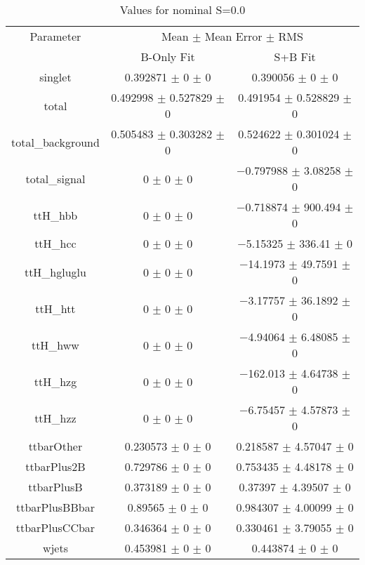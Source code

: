 \begin{table}
\centering
\caption{Values for nominal S=0.0}
\begin{tabular}{ccc}
\toprule
Parameter & \multicolumn{2}{c}{Mean $\pm$ Mean Error $\pm$ RMS}\\
 & B-Only Fit & S+B Fit\\
\midrule
singlet & \num{0.392871} $\pm$ \num{0} $\pm$ \num{0} & \num{0.390056} $\pm$ \num{0} $\pm$ \num{0}\\
total & \num{0.492998} $\pm$ \num{0.527829} $\pm$ \num{0} & \num{0.491954} $\pm$ \num{0.528829} $\pm$ \num{0}\\
total\_background & \num{0.505483} $\pm$ \num{0.303282} $\pm$ \num{0} & \num{0.524622} $\pm$ \num{0.301024} $\pm$ \num{0}\\
total\_signal & \num{0} $\pm$ \num{0} $\pm$ \num{0} & \num{-0.797988} $\pm$ \num{3.08258} $\pm$ \num{0}\\
ttH\_hbb & \num{0} $\pm$ \num{0} $\pm$ \num{0} & \num{-0.718874} $\pm$ \num{900.494} $\pm$ \num{0}\\
ttH\_hcc & \num{0} $\pm$ \num{0} $\pm$ \num{0} & \num{-5.15325} $\pm$ \num{336.41} $\pm$ \num{0}\\
ttH\_hgluglu & \num{0} $\pm$ \num{0} $\pm$ \num{0} & \num{-14.1973} $\pm$ \num{49.7591} $\pm$ \num{0}\\
ttH\_htt & \num{0} $\pm$ \num{0} $\pm$ \num{0} & \num{-3.17757} $\pm$ \num{36.1892} $\pm$ \num{0}\\
ttH\_hww & \num{0} $\pm$ \num{0} $\pm$ \num{0} & \num{-4.94064} $\pm$ \num{6.48085} $\pm$ \num{0}\\
ttH\_hzg & \num{0} $\pm$ \num{0} $\pm$ \num{0} & \num{-162.013} $\pm$ \num{4.64738} $\pm$ \num{0}\\
ttH\_hzz & \num{0} $\pm$ \num{0} $\pm$ \num{0} & \num{-6.75457} $\pm$ \num{4.57873} $\pm$ \num{0}\\
ttbarOther & \num{0.230573} $\pm$ \num{0} $\pm$ \num{0} & \num{0.218587} $\pm$ \num{4.57047} $\pm$ \num{0}\\
ttbarPlus2B & \num{0.729786} $\pm$ \num{0} $\pm$ \num{0} & \num{0.753435} $\pm$ \num{4.48178} $\pm$ \num{0}\\
ttbarPlusB & \num{0.373189} $\pm$ \num{0} $\pm$ \num{0} & \num{0.37397} $\pm$ \num{4.39507} $\pm$ \num{0}\\
ttbarPlusBBbar & \num{0.89565} $\pm$ \num{0} $\pm$ \num{0} & \num{0.984307} $\pm$ \num{4.00099} $\pm$ \num{0}\\
ttbarPlusCCbar & \num{0.346364} $\pm$ \num{0} $\pm$ \num{0} & \num{0.330461} $\pm$ \num{3.79055} $\pm$ \num{0}\\
wjets & \num{0.453981} $\pm$ \num{0} $\pm$ \num{0} & \num{0.443874} $\pm$ \num{0} $\pm$ \num{0}\\
\bottomrule
\end{tabular}
\end{table}